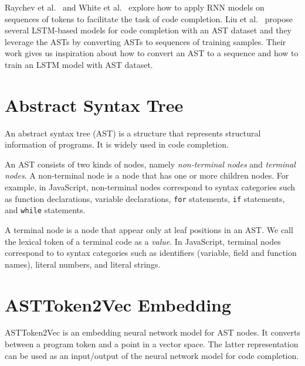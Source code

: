\documentclass[E]{compsoft}
\begin{document}
Raychev et al.\  \cite{raychev2014code} and White et al.\  \cite{white2015toward} explore how to apply RNN models on sequences of tokens to facilitate the task of code completion.
Liu et al.\  \cite{liu2016neural} propose several LSTM-based models for code completion with an AST dataset and they leverage the ASTs by converting ASTs to sequences of training samples. 
Their work gives us inspiration about how to convert an AST to a sequence and how to train an LSTM model with AST dataset. 



\section{Abstract Syntax Tree}
An abstract syntax tree (AST) is a structure that represents structural information of programs. It is widely used in code completion.

An AST consists of two kinds of nodes, namely \emph{non-terminal nodes} and \emph{terminal nodes}.
A non-terminal node is a node that has one or more children nodes. 
For example, in JavaScript, non-terminal nodes correspond to syntax categories such as function declarations, variable declarations, \texttt{for} statements, \texttt{if} statements, and \texttt{while} statements.

A terminal node is a node that appear only at leaf positions in an AST.
We call the lexical token of a terminal code as a \emph{value}.
In JavaScript, terminal nodes correspond to to syntax categories such as identifiers (variable, field and function names), literal numbers, and literal strings.  




\section{ASTToken2Vec Embedding}
\label{section:node2vec}
ASTToken2Vec is an embedding neural network model for AST nodes. It converts between a program token and a point in a vector space.  The latter representation can be used as an input/output of the neural network model for code completion.  
\end{document}

